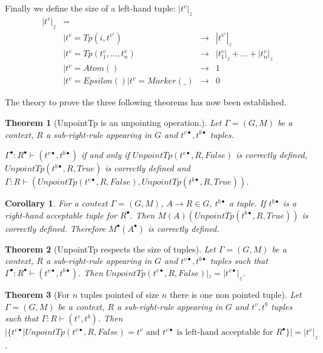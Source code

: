 \documentclass{article}
\newtheorem{theorem}{Theorem}
\newtheorem{corollary}{Corollary}
\begin{document}
Finally we define the size of a left-hand tuple: $|t^v|_z$
\begin{align*}
|t^v|_z &= &\\
&| t^v = Tp(i, t^{v'}) &\rightarrow &|t^{v'}|_z\\
&| t^v = Tp(t^v_1, ..., t^v_n) &\rightarrow &|t^v_1|_z + ... + |t^v_n|_z \\
&| t^v = Atom() &\rightarrow& 1\\
&| t^v = Epsilon() | t^v = Marker(\_) &\rightarrow &0
\end{align*}

The theory to prove the three following theorems has now been established.
\begin{theorem}[UnpointTp is an unpointing operation.]
Let $\Gamma = (G, M)$ be a context, $R$ a sub-right-rule appearing in $G$ and $t^{v\bullet}, t^{b\bullet}$ tuples.
 
 $\Gamma^{\bullet}:R^{\bullet} \vdash (t^{v\bullet}, t^{b\bullet})$ if and only if $UnpointTp(t^{v\bullet}, R, False)$ is correctly defined, $UnpointTp(t^{b\bullet}, R, True)$ is correctly defined and $\Gamma:R \vdash (UnpointTp(t^{v\bullet}, R, False), UnpointTp(t^{b\bullet}, R, True))$.
\end{theorem}

\begin{corollary}
For a context $\Gamma = (G, M)$, $A \rightarrow R \in G$, $t^{b\bullet}$ a tuple. If $t^{b\bullet}$ is a right-hand acceptable tuple for $R^{\bullet}$. Then $M(A)(UnpointTp(t^{b\bullet}, R, True))$ is correctly defined. Therefore $M^{\bullet}(A^{\bullet})$ is correctly defined.
\end{corollary}

\begin{theorem}[UnpointTp respects the size of tuples]
Let $\Gamma = (G, M)$ be a context, $R$ a sub-right-rule appearing in $G$ and $t^{v\bullet}, t^{b\bullet}$ tuples such that $\Gamma^{\bullet}: R^{\bullet} \vdash (t^{v\bullet}, t^{b\bullet})$. Then $UnpointTp(t^{v\bullet}, R, False)|_z = |t^{v\bullet}|_z$.
\end{theorem}

\begin{theorem}[For $n$ tuples pointed of size $n$ there is one non pointed tuple]
Let $\Gamma = (G, M)$ be a context, $R$ a sub-right-rule appearing in $G$ and $t^v, t^b$ tuples such that $\Gamma: R \vdash (t^v, t^b)$. Then $|\{t^{v\bullet} | UnpointTp(t^{v\bullet}, R, False) = t^v \text{ and $t^{v\bullet}$ is left-hand acceptable for $R^{\bullet}$}\}| = |t^v|_z$.
\end{theorem}
\end{document}
